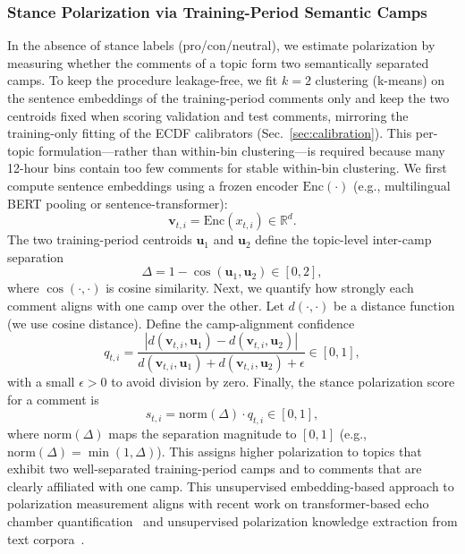 \documentclass[journal]{IEEEtran}
\begin{document}
\subsubsection{Stance Polarization via Training-Period Semantic Camps}
In the absence of stance labels (pro/con/neutral), we estimate polarization by measuring whether the comments of a topic form two semantically separated camps. To keep the procedure leakage-free, we fit $k{=}2$ clustering (k-means) on the sentence embeddings of the training-period comments only and keep the two centroids fixed when scoring validation and test comments, mirroring the training-only fitting of the ECDF calibrators (Sec.~\ref{sec:calibration}). This per-topic formulation---rather than within-bin clustering---is required because many 12-hour bins contain too few comments for stable within-bin clustering. We first compute sentence embeddings using a frozen encoder $\mathrm{Enc}(\cdot)$ (e.g., multilingual BERT pooling or sentence-transformer):
\begin{equation}
\mathbf{v}_{t,i} = \mathrm{Enc}(x_{t,i}) \in \mathbb{R}^d.
\label{eq:embedding}
\end{equation}
The two training-period centroids $\mathbf{u}_1$ and $\mathbf{u}_2$ define the topic-level inter-camp separation
\begin{equation}
\Delta = 1 - \cos(\mathbf{u}_{1}, \mathbf{u}_{2}) \in [0,2],
\label{eq:camp_separation}
\end{equation}
where $\cos(\cdot,\cdot)$ is cosine similarity. Next, we quantify how strongly each comment aligns with one camp over the other. Let $d(\cdot,\cdot)$ be a distance function (we use cosine distance). Define the camp-alignment confidence
\begin{equation}
q_{t,i} = \frac{\left|d(\mathbf{v}_{t,i},\mathbf{u}_{1}) - d(\mathbf{v}_{t,i},\mathbf{u}_{2})\right|}
{d(\mathbf{v}_{t,i},\mathbf{u}_{1}) + d(\mathbf{v}_{t,i},\mathbf{u}_{2}) + \epsilon} \in [0,1],
\label{eq:alignment_confidence}
\end{equation}
with a small $\epsilon>0$ to avoid division by zero. Finally, the stance polarization score for a comment is
\begin{equation}
s_{t,i} = \mathrm{norm}(\Delta)\cdot q_{t,i} \in [0,1],
\label{eq:stance_score}
\end{equation}
where $\mathrm{norm}(\Delta)$ maps the separation magnitude to $[0,1]$ (e.g., $\mathrm{norm}(\Delta)=\min(1,\Delta)$). This assigns higher polarization to topics that exhibit two well-separated training-period camps and to comments that are clearly affiliated with one camp. This unsupervised embedding-based approach to polarization measurement aligns with recent work on transformer-based echo chamber quantification~\cite{ghafouri2024echo} and unsupervised polarization knowledge extraction from text corpora~\cite{paschalides2025polar}.
\end{document}
